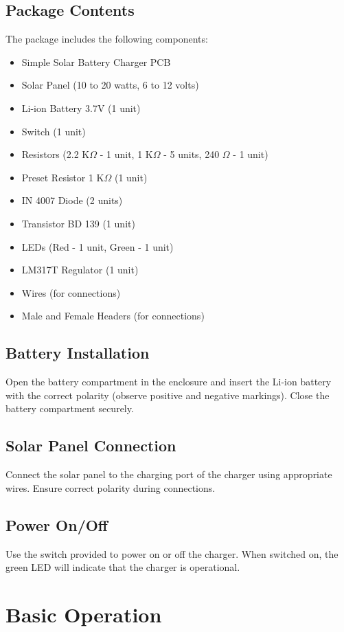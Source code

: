 \documentclass[twocolumn]{article}
\begin{document}
\subsection{Package Contents}
The package includes the following components:
\begin{itemize}
  \item Simple Solar Battery Charger PCB
  \item Solar Panel (10 to 20 watts, 6 to 12 volts)
  \item Li-ion Battery 3.7V (1 unit)
  \item Switch (1 unit)
  \item Resistors (2.2 K$\Omega$ - 1 unit, 1 K$\Omega$ - 5 units, 240 $\Omega$ - 1 unit)
  \item Preset Resistor 1 K$\Omega$ (1 unit)
  \item IN 4007 Diode (2 units)
  \item Transistor BD 139 (1 unit)
  \item LEDs (Red - 1 unit, Green - 1 unit)
  \item LM317T Regulator (1 unit)
  \item Wires (for connections)
  \item Male and Female Headers (for connections)
\end{itemize}

\subsection{Battery Installation}
Open the battery compartment in the enclosure and insert the Li-ion battery with the correct polarity (observe positive and negative markings). Close the battery compartment securely.

\subsection{Solar Panel Connection}
Connect the solar panel to the charging port of the charger using appropriate wires. Ensure correct polarity during connections.

\subsection{Power On/Off}
Use the switch provided to power on or off the charger. When switched on, the green LED will indicate that the charger is operational.

\section{Basic Operation}
\end{document}
